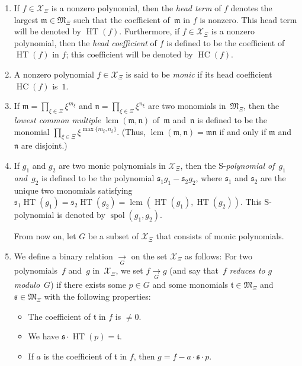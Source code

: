 \documentclass[pdftex]{sigma}
\numberwithin{equation}{section}
\let\prodnonlimits\prod
\renewcommand{\prod}{\prodnonlimits\limits}
\begin{document}
\begin{Definition}
\begin{enumerate}
\item[(d)] If $f\in\mathcal{X}_{\Xi}$ is a nonzero polynomial, then the \textit{head term} of $f$ denotes the largest $\mathfrak{m}\in\mathfrak{M}_{\Xi}$ such that the coefficient of~$\mathfrak{m}$ in $f$ is nonzero. This head term will be denoted by $\operatorname*{HT}(f) $. Furthermore, if $f\in\mathcal{X}_{\Xi}$ is a nonzero polynomial, then the \textit{head coefficient} of $f$ is defined to be the coefficient of~$\operatorname*{HT}(f) $ in $f$; this coefficient will be denoted by $\operatorname*{HC}(f) $.
\item[(e)] A nonzero polynomial $f\in\mathcal{X}_{\Xi}$ is said to be \textit{monic} if its head coefficient~$\operatorname*{HC}(f) $ is~$1$.
\item[(f)] If $\mathfrak{m}=\prod_{\xi\in\Xi}\xi^{m_{\xi}}$ and $\mathfrak{n}=\prod_{\xi\in\Xi}\xi^{n_{\xi}}$ are two monomials in~$\mathfrak{M}_{\Xi}$, then the \textit{lowest common multiple} $\operatorname{lcm}( \mathfrak{m},\mathfrak{n}) $ of~$\mathfrak{m}$ and~$\mathfrak{n}$ is defined to be the monomial $\prod_{\xi \in\Xi}\xi^{\max \{ m_{\xi},n_{\xi} \} }$. (Thus, $\operatorname{lcm} ( \mathfrak{m},\mathfrak{n} ) =\mathfrak{mn}$ if and only if $\mathfrak{m}$ and $\mathfrak{n}$ are disjoint.)
\item[(g)] If $g_{1}$ and $g_{2}$ are two monic polynomials in $\mathcal{X}_{\Xi}$, then the S-\textit{polynomial of}~$g_{1}$ \textit{and}~$g_{2}$ is defined to be the polynomial $\mathfrak{s}_{1}g_{1}-\mathfrak{s}_{2}g_{2}$, where $\mathfrak{s}_{1}$ and $\mathfrak{s}_{2}$ are the unique two monomials satisfying $\mathfrak{s}_{1}\operatorname*{HT} ( g_{1} ) =\mathfrak{s}_{2}\operatorname*{HT} ( g_{2} ) =\operatorname{lcm} ( \operatorname*{HT} ( g_{1} ) ,\operatorname*{HT} (g_{2}) ) $. This S-polynomial is denoted by $\operatorname*{spol} ( g_{1},g_{2} ) $.

From now on, let $G$ be a subset of $\mathcal{X}_{\Xi}$ that consists of monic polynomials.

\item[(h)] We define a binary relation $\underset{G}{\longrightarrow}$ on the set $\mathcal{X}_{\Xi}$ as follows: For two polynomials~$f$ and~$g$ in~$\mathcal{X}_{\Xi}$, we set $f\underset{G}{\longrightarrow}g$ (and say that~$f$ \textit{reduces to }$g$ \textit{modulo}~$G$) if there exists some $p\in G$ and some monomials $\mathfrak{t}\in\mathfrak{M}_{\Xi}$ and $\mathfrak{s} \in\mathfrak{M}_{\Xi}$ with the following properties:
\begin{itemize}\itemsep=0pt
\item The coefficient of $\mathfrak{t}$ in $f$ is $\neq0$.
\item We have $\mathfrak{s}\cdot\operatorname*{HT}(p) =\mathfrak{t}$.
\item If $a$ is the coefficient of $\mathfrak{t}$ in $f$, then $g=f-a\cdot \mathfrak{s}\cdot p$.
\end{itemize}


\end{enumerate}
\end{Definition}
\end{document}
